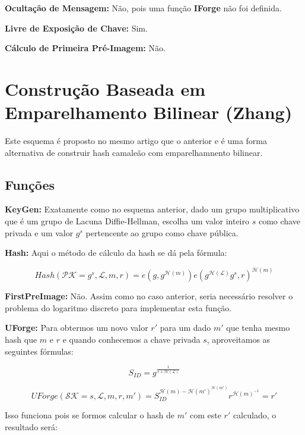 \documentclass[a4paper]{article}
\begin{document}
\textbf{Ocultação de Mensagem: }Não, pois uma função \textbf{IForge}
não foi definida.

\textbf{Livre de Exposição de Chave: } Sim.

\textbf{Cálculo de Primeira Pré-Imagem: }Não.

\section{Construção Baseada em Emparelhamento Bilinear (Zhang) \cite{zhang}}

Este esquema é proposto no mesmo artigo que o anterior e é uma forma
alternativa de construir hash camaleão com emparelhamnento bilinear.

\subsection{Funções}

\textbf{KeyGen: }Exatamente como no esquema anterior, dado um grupo
multiplicativo que é um grupo de Lacuna Diffie-Hellman, escolha um
valor inteiro $s$ como chave privada e um valor $g^s$ pertencente ao
grupo como chave pública.

\textbf{Hash: } Aqui o método de cálculo da hash se dá pela fórmula:

$$
Hash(\mathcal{PK}=g^s, \mathcal{L}, m, r) = e(g, g^{\mathcal{H}(m)})e(g^{\mathcal{H}(\mathcal{L})}g^s, r)^{\mathcal{H}(m)}
$$

\textbf{FirstPreImage:} Não. Assim como no caso anterior, seria
necessário resolver o problema do logaritmo discreto para implementar
esta função.

\textbf{UForge:} Para obtermos um novo valor $r'$ para um dado $m'$
que tenha mesmo hash que $m$ e $r$ e quando conhecemos a chave privada
$s$, aproveitamos as seguintes fórmulas:

$$
S_{ID} = g^{\frac{1}{s+\mathcal{H}(\mathcal{L})}}
$$

$$
UForge(\mathcal{SK}=s, \mathcal{L}, m, r, m') = S_{ID}^{\mathcal{H}(m)-\mathcal{H}(m')^{\mathcal{H}(m')}}r^{\mathcal{H}(m)^{-1}} = r'
$$

Isso funciona pois se formos calcular o hash de $m'$ com este $r'$
calculado, o resultado será:
\end{document}

